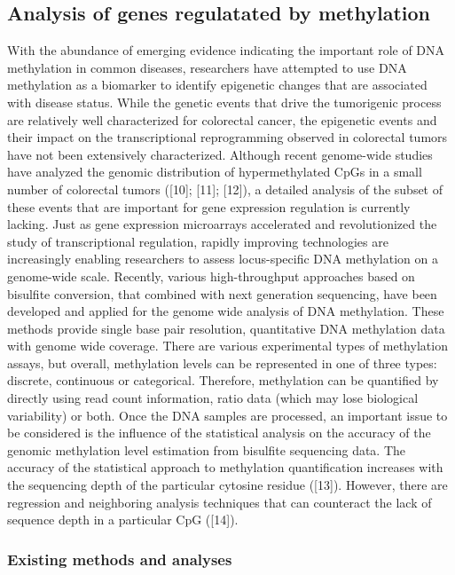 \documentclass[10pt,letterpaper]{article}
\begin{document}
\hypertarget{analysis-of-genes-regulatated-by-methylation}{%
\subsection{Analysis of genes regulatated by
methylation}\label{analysis-of-genes-regulatated-by-methylation}}

With the abundance of emerging evidence indicating the important role of
DNA methylation in common diseases, researchers have attempted to use
DNA methylation as a biomarker to identify epigenetic changes that are
associated with disease status. While the genetic events that drive the
tumorigenic process are relatively well characterized for colorectal
cancer, the epigenetic events and their impact on the transcriptional
reprogramming observed in colorectal tumors have not been extensively
characterized. Although recent genome-wide studies have analyzed the
genomic distribution of hypermethylated CpGs in a small number of
colorectal tumors ({[}10{]}; {[}11{]}; {[}12{]}), a detailed analysis of
the subset of these events that are important for gene expression
regulation is currently lacking. Just as gene expression microarrays
accelerated and revolutionized the study of transcriptional regulation,
rapidly improving technologies are increasingly enabling researchers to
assess locus-specific DNA methylation on a genome-wide scale. Recently,
various high-throughput approaches based on bisulfite conversion, that
combined with next generation sequencing, have been developed and
applied for the genome wide analysis of DNA methylation. These methods
provide single base pair resolution, quantitative DNA methylation data
with genome wide coverage. There are various experimental types of
methylation assays, but overall, methylation levels can be represented
in one of three types: discrete, continuous or categorical. Therefore,
methylation can be quantified by directly using read count information,
ratio data (which may lose biological variability) or both. Once the DNA
samples are processed, an important issue to be considered is the
influence of the statistical analysis on the accuracy of the genomic
methylation level estimation from bisulfite sequencing data. The
accuracy of the statistical approach to methylation quantification
increases with the sequencing depth of the particular cytosine residue
({[}13{]}). However, there are regression and neighboring analysis
techniques that can counteract the lack of sequence depth in a
particular CpG ({[}14{]}).

\hypertarget{existing-methods-and-analyses}{%
\subsubsection{Existing methods and
analyses}\label{existing-methods-and-analyses}}
\end{document}
